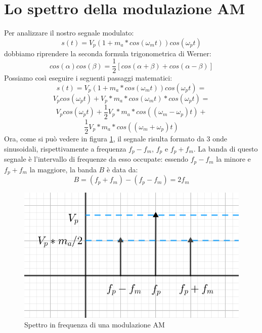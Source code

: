 \documentclass[11pt,a4paper]{article}
\begin{document}
\section{Lo spettro della modulazione AM}
Per analizzare il nostro segnale modulato:
$$
s(t) = V_p (1 + m_a * cos(\omega_m t) ) cos(\omega_p t)
$$
dobbiamo riprendere la seconda formula trigonometrica di Werner:
$$
cos(\alpha) cos(\beta) = \frac{1}{2} [ cos(\alpha + \beta) + cos(\alpha - \beta) ]
$$
Possiamo così eseguire i seguenti passaggi matematici:
$$
s(t) = V_p (1 + m_a * cos(\omega_m t) ) cos(\omega_p t) =
$$
$$
V_p cos(\omega_p t) + V_p * m_a * cos(\omega_m t) * cos(\omega_p t) =
$$
$$
V_p cos(\omega_p t) + \frac{1}{2} V_p * m_a * cos((\omega_m - \omega_p) t) + 
$$
$$
\frac{1}{2} V_p * m_a * cos((\omega_m + \omega_p) t)
$$
Ora, come si può vedere in figura \ref{fig:modAM}, il segnale risulta formato da 3 onde sinusoidali, rispettivamente a frequenza $f_p - f_m$, $f_p$ e $f_p + f_m$. La banda di questo segnale è l'intervallo di frequenze da esso occupate: essendo $f_p - f_m$ la minore e $f_p + f_m$ la maggiore, la banda $B$ è data da:
$$
B = (f_p + f_m) - (f_p - f_m) = 2 f_m
$$

\begin{figure}
  \includegraphics[width=\linewidth]{images/spettroAM.png}
  \caption{Spettro in frequenza di una modulazione AM}
  \label{fig:modAM}
\end{figure}
\end{document}
